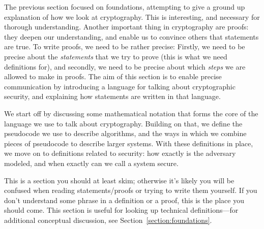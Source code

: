 The previous section focused on foundations, attempting to give a ground up explanation of how we look at cryptography. This is interesting, and necessary for thorough understanding. Another important thing in cryptography are proofs: they deepen our understanding, and enable us to convince others that statements are true. To write proofs, we need to be rather precise: Firstly, we need to be precise about the \emph{statements} that we try to prove (this is what we need definitions for), and secondly, we need to be precise about which \emph{steps} we are allowed to make in proofs. The aim of this section is to enable precise communication by introducing a language for talking about cryptographic security, and explaining how statements are written in that language.

We start off by discussing some mathematical notation that forms the core of the language we use to talk about cryptography. Building on that, we define the pseudocode we use to describe algorithms, and the ways in which we combine pieces of pseudocode to describe larger systems. With these definitions in place, we move on to definitions related to security: how exactly is the adversary modeled, and when exactly can we call a system secure. 

This is a section you should at least skim; otherwise it's likely you will be confused when reading statements/proofs or trying to write them yourself. If you don't understand some phrase in a definition or a proof, this is the place you should come. This section is useful for looking up technical definitions---for additional conceptual discussion, see Section~\ref{section:foundations}.